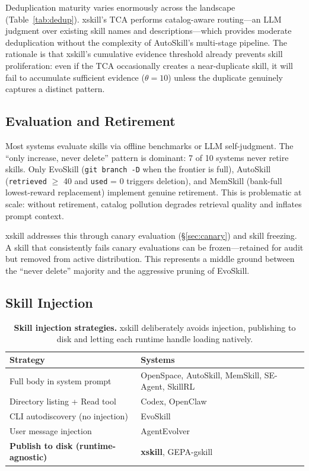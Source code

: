 \documentclass{article}
\begin{document}
Deduplication maturity varies enormously across the landscape (Table~\ref{tab:dedup}). xskill's TCA performs catalog-aware routing---an LLM judgment over existing skill names and descriptions---which provides moderate deduplication without the complexity of AutoSkill's multi-stage pipeline. The rationale is that xskill's cumulative evidence threshold already prevents skill proliferation: even if the TCA occasionally creates a near-duplicate skill, it will fail to accumulate sufficient evidence ($\theta = 10$) unless the duplicate genuinely captures a distinct pattern.

\subsection{Evaluation and Retirement}

Most systems evaluate skills via offline benchmarks or LLM self-judgment. The ``only increase, never delete'' pattern is dominant: 7 of 10 systems never retire skills. Only EvoSkill (\texttt{git branch -D} when the frontier is full), AutoSkill (\texttt{retrieved} $\geq$ 40 and \texttt{used} = 0 triggers deletion), and MemSkill (bank-full lowest-reward replacement) implement genuine retirement. This is problematic at scale: without retirement, catalog pollution degrades retrieval quality and inflates prompt context.

xskill addresses this through canary evaluation (\S\ref{sec:canary}) and skill freezing. A skill that consistently fails canary evaluations can be frozen---retained for audit but removed from active distribution. This represents a middle ground between the ``never delete'' majority and the aggressive pruning of EvoSkill.

\subsection{Skill Injection}

\begin{table}[t]
\centering
\caption{\textbf{Skill injection strategies.} xskill deliberately avoids injection, publishing to disk and letting each runtime handle loading natively.}
\label{tab:injection}
\small
\begin{tabular}{@{}ll@{}}
\toprule
\textbf{Strategy} & \textbf{Systems} \\
\midrule
Full body in system prompt & OpenSpace, AutoSkill, MemSkill, SE-Agent, SkillRL \\
Directory listing + Read tool & Codex, OpenClaw \\
CLI autodiscovery (no injection) & EvoSkill \\
User message injection & AgentEvolver \\
\textbf{Publish to disk (runtime-agnostic)} & \textbf{xskill}, GEPA-gskill \\
\bottomrule
\end{tabular}
\end{table}
\end{document}
